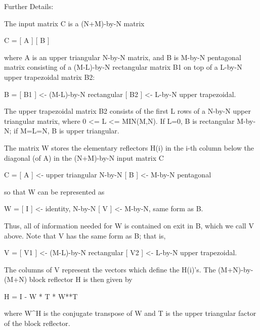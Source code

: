 \begin{DoxyParagraph}{Further Details\+: }
\begin{DoxyVerb}  The input matrix C is a (N+M)-by-N matrix  

               C = [ A ]
                   [ B ]        

  where A is an upper triangular N-by-N matrix, and B is M-by-N pentagonal
  matrix consisting of a (M-L)-by-N rectangular matrix B1 on top of a L-by-N
  upper trapezoidal matrix B2:

               B = [ B1 ]  <- (M-L)-by-N rectangular
                   [ B2 ]  <-     L-by-N upper trapezoidal.

  The upper trapezoidal matrix B2 consists of the first L rows of a
  N-by-N upper triangular matrix, where 0 <= L <= MIN(M,N).  If L=0, 
  B is rectangular M-by-N; if M=L=N, B is upper triangular.  

  The matrix W stores the elementary reflectors H(i) in the i-th column
  below the diagonal (of A) in the (N+M)-by-N input matrix C

               C = [ A ]  <- upper triangular N-by-N
                   [ B ]  <- M-by-N pentagonal

  so that W can be represented as

               W = [ I ]  <- identity, N-by-N
                   [ V ]  <- M-by-N, same form as B.

  Thus, all of information needed for W is contained on exit in B, which
  we call V above.  Note that V has the same form as B; that is, 

               V = [ V1 ] <- (M-L)-by-N rectangular
                   [ V2 ] <-     L-by-N upper trapezoidal.

  The columns of V represent the vectors which define the H(i)'s.  
  The (M+N)-by-(M+N) block reflector H is then given by

               H = I - W * T * W**T

  where W^H is the conjugate transpose of W and T is the upper triangular
  factor of the block reflector.\end{DoxyVerb}
 
\end{DoxyParagraph}
